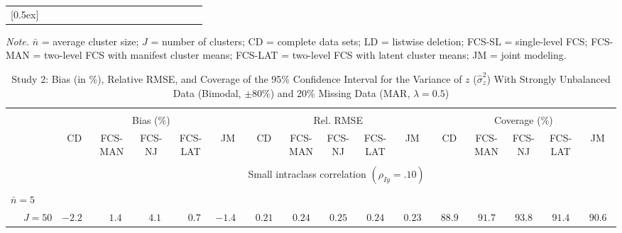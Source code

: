 \begin{sidewaystable}
\begin{threeparttable}
\begin{tabular}{llccccccccccccccc}
[0.5ex]\hline\\[-1.6ex] 
\end{tabular}
\begin{tablenotes}{\footnotesize \textit{Note.} $\bar{n}$ = average cluster size; $J$ = number of clusters; CD = complete data sets; LD = listwise deletion; FCS-SL = single-level FCS; FCS-MAN = two-level FCS with manifest cluster means; FCS-LAT = two-level FCS with latent cluster means; JM = joint modeling.}\end{tablenotes}
\end{threeparttable}
\end{sidewaystable}
\begin{sidewaystable}
\begin{threeparttable}
\setlength{\tabcolsep}{1.0pt}
\renewcommand{\arraystretch}{0.95}
\footnotesize
\caption{\small Study 2: Bias (in \%), Relative RMSE, and Coverage of the 95\% Confidence Interval for the Variance of $z$ ($\hat\sigma_z^2$) With Strongly Unbalanced Data (Bimodal, $\pm 80\%$) and 20\% Missing Data (MAR, $\lambda=0.5$)}
\begin{tabular}{llccccccccccccccc}
\hline\\[-1.8ex]
& & \multicolumn{5}{c}{Bias (\%)} & \multicolumn{5}{c}{Rel. RMSE} & \multicolumn{5}{c}{Coverage (\%)} \\ \cmidrule(r){3-7}\cmidrule(r){8-12}\cmidrule(r){13-17}
 &  & CD & \makecell{FCS-\\MAN} & \makecell{FCS-\\NJ} & \makecell{FCS-\\LAT} & JM & CD & \makecell{FCS-\\MAN} & \makecell{FCS-\\NJ} & \makecell{FCS-\\LAT} & JM & CD & \makecell{FCS-\\MAN} & \makecell{FCS-\\NJ} & \makecell{FCS-\\LAT} & \multicolumn{1}{c}{JM} \\ 
[0.4ex]\hline\\[-1.8ex]
& & \multicolumn{15}{c}{Small intraclass correlation $(\rho_{Iy}=.10)$} \\[0.6ex]\hline\\[-1.8ex]
\multicolumn{4}{l}{$\bar{n}=5$} \\  & \nopagebreak $\;J=50$  & ${-}2.2\phantom{0}$ & $\phantom{-}1.4\phantom{0}$ & $\phantom{-}4.1\phantom{0}$ & $\phantom{-}0.7\phantom{0}$ & ${-}1.4\phantom{0}$ & $\phantom{0}0.21\phantom{0}$ & $\phantom{0}0.24\phantom{0}$ & $\phantom{0}0.25\phantom{0}$ & $\phantom{0}0.24\phantom{0}$ & $\phantom{0}0.23\phantom{0}$ & $\phantom{0}88.9\phantom{0}$ & $\phantom{0}91.7\phantom{0}$ & $\phantom{0}93.8\phantom{0}$ & $\phantom{0}91.4\phantom{0}$ & $\phantom{0}90.6\phantom{0}$ \\

\end{tabular}
\end{threeparttable}
\end{sidewaystable}
